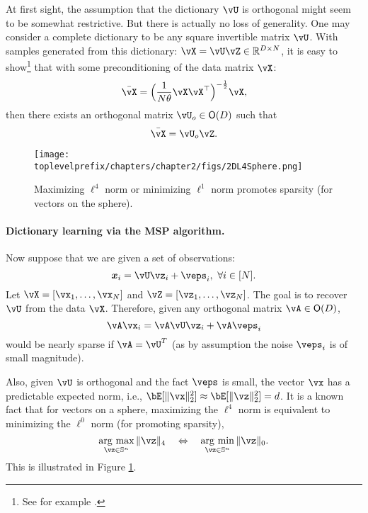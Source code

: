 \documentclass[../../book-main.tex]{subfiles}
\begin{document}
\begin{remark} 
At first sight, the assumption that the dictionary $\vU$ is orthogonal might seem to be somewhat restrictive. But there is actually no loss of generality. One may consider a complete dictionary to be any square invertible matrix $\vU$. With samples generated from this dictionary: $\vX = \vU \vZ \in \mathbb{R}^{D\times N}$, it is easy to show\footnote{See for example \cite{sun2017completeI}.} that with some preconditioning of the data matrix $\vX$: 
\begin{equation}
    \bar{\vX} = \Big(\frac{1}{N\theta} \vX\vX^\top\Big)^{-\frac{1}{2}}\vX,
\end{equation}
then there exists an orthogonal matrix $\vU_{o} \in \O(D)$ such that
\begin{equation}
    \bar{\vX} = \vU_{o}\vZ.
\end{equation}
\end{remark}



\begin{figure}
    \centering
    \texttt{[image: \\toplevelprefix/chapters/chapter2/figs/2DL4Sphere.png]}\vspace{-0.1in}
    \caption{Maximizing $\ell^4$ norm or minimizing $\ell^1$ norm promotes sparsity (for vectors on the sphere).}
    \label{fig:L4-sphere}
\end{figure}


\paragraph{Dictionary learning via the MSP algorithm.}

Now suppose that we are given a set of observations:
\begin{equation}
    \x_i = \vU \vz_i + \veps_i,\ \forall i \in [N].
\end{equation}
Let $\vX = [\vx_1, \dots, \vx_N]$ and $\vZ = [\vz_1, \dots, \vz_N]$. The goal is to recover $\vU$ from the data $\vX$. Therefore, given any orthogonal matrix $\vA \in \O(D)$, 
\begin{equation}
    \vA\vx_i = \vA\vU \vz_i + \vA\veps_i
\end{equation}
would be nearly sparse if $\vA = \vU^T$ (as by assumption the noise $\veps_i$ is of small magnitude). 

Also, given $\vU$ is orthogonal and the fact $\veps$ is small, the vector $\vx$ has a predictable expected norm, i.e., $\bE[\norm{\vx}_2^2] \approx \bE[\norm{\vz}_2^2]=d$. It is a known fact that for vectors on a sphere, maximizing the $\ell^4$ norm is equivalent to minimizing the $\ell^0$ norm (for promoting sparsity),
\begin{equation}
    \argmax_{\vz \in \mathbb{S}^n}\|\vz\|_{4}\quad\Leftrightarrow\quad \argmin_{\vz \in \mathbb{S}^n}\|\vz\|_{0}.
\end{equation}
This is illustrated in Figure \ref{fig:L4-sphere}.
\end{document}
